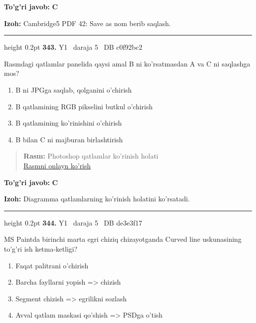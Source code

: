 \documentclass[10pt,a4paper,oneside]{article}
\begin{document}
\begin{tcolorbox}[enhanced,breakable,colback=teal!4,colframe=teal!45!black,boxrule=0.45pt,arc=1.2mm,left=2.8mm,right=2.8mm,top=2mm,bottom=2mm,before skip=2mm,after skip=2mm]
\textbf{\color{teal}To'g'ri javob:} \textbf{C}
\par\smallskip
\textbf{Izoh:} Cambridge5 PDF 42: Save as nom berib saqlash.
\end{tcolorbox}
\vspace{2mm}\hrule height 0.2pt \vspace{4mm}
\hypertarget{q343}{\textbf{\color{ink}343.}}  {\color{muted}\scriptsize Y1 \textbullet\ daraja 5 \textbullet\ DB c0f92bc2}
\par
Rasmdagi qatlamlar panelida qaysi amal B ni ko'rsatmasdan A va C ni saqlashga mos?
\begin{enumerate}[label=\Alph*),leftmargin=9mm]
\item B ni JPGga saqlab, qolganini o'chirish
\item B qatlamining RGB pikselini butkul o'chirish
\item B qatlamining ko'rinishini o'chirish
\item B bilan C ni majburan birlashtirish
\end{enumerate}
\begin{quote}\footnotesize\color{muted}\textbf{Rasm:} Photoshop qatlamlar ko'rinish holati\\
\href{https://github.com/sarvar9417/attestatsiya/blob/main/public/graphics-web-v2/layer_stack.svg}{Rasmni onlayn ko'rish}
\end{quote}
\begin{tcolorbox}[enhanced,breakable,colback=teal!4,colframe=teal!45!black,boxrule=0.45pt,arc=1.2mm,left=2.8mm,right=2.8mm,top=2mm,bottom=2mm,before skip=2mm,after skip=2mm]
\textbf{\color{teal}To'g'ri javob:} \textbf{C}
\par\smallskip
\textbf{Izoh:} Diagramma qatlamlarning ko'rinish holatini ko'rsatadi.
\end{tcolorbox}
\vspace{2mm}\hrule height 0.2pt \vspace{4mm}
\hypertarget{q344}{\textbf{\color{ink}344.}}  {\color{muted}\scriptsize Y1 \textbullet\ daraja 5 \textbullet\ DB de3e3f17}
\par
MS Paintda birinchi marta egri chiziq chizayotganda Curved line uskunasining to'g'ri ish ketma-ketligi?
\begin{enumerate}[label=\Alph*),leftmargin=9mm]
\item Faqat palitrani o'chirish
\item Barcha fayllarni yopish =\textgreater{} chizish
\item Segment chizish =\textgreater{} egrilikni sozlash
\item Avval qatlam maskasi qo'shish =\textgreater{} PSDga o'tish
\end{enumerate}
\end{document}
